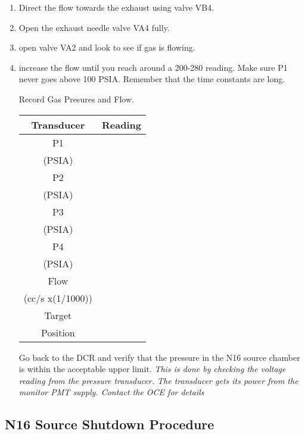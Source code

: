 \begin{enumerate}
\item\checkbox Direct the flow towards the exhaust using valve VB4.

\item\checkbox Open the exhaust needle valve VA4 fully.

\item{} open valve VA2 and look to see if gas is flowing.

\item{} increase the flow until you reach around a 200-280
  reading. Make sure P1 never goes above 100 PSIA. Remember that
  the time constants are long.


\checkitem 
  Record Gas Presures and Flow.
  \begin{center}
  \begin{tabular}{|c|c|}
  \hline
  Transducer & Reading\\
  \hline
    P1 & \\
  (PSIA) & \\
  \hline 
    P2 & \\
     (PSIA)  & \\
  \hline 
    P3 & \\
     (PSIA)  & \\
  \hline 
    P4 & \\
     (PSIA)  & \\
  \hline 
    Flow & \\
    (cc/s x(1/1000)) & \\
  \hline 
    Target   & \\
    Position & \\
  \hline 
  \end{tabular}
  \end{center}


\checkitem Go back to the DCR and verify that the pressure in the N16 source chamber is within
the acceptable upper limit.
\small
{\em This is done by checking the voltage reading from the pressure transducer. The transducer gets
its power from the monitor PMT supply. Contact the OCE for details }


\normalsize


\end{enumerate}




\newpage
\subsection{N16 Source Shutdown Procedure}

